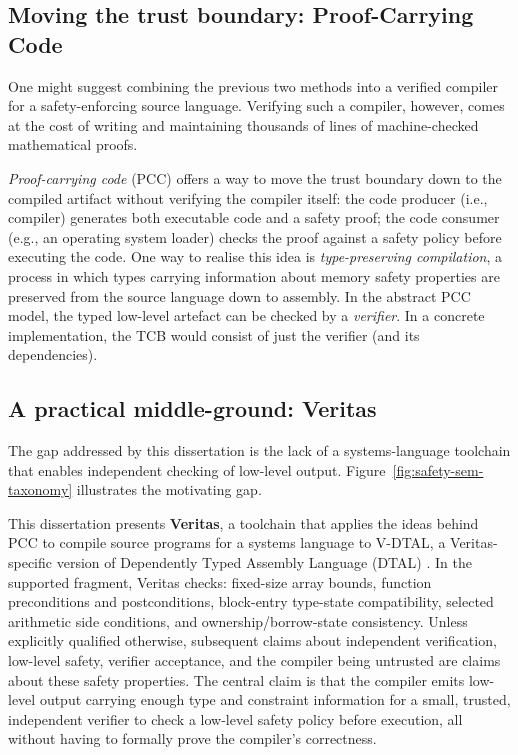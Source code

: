 \subsection{Moving the trust boundary: Proof-Carrying Code}

One might suggest combining the previous two methods into a verified compiler for a safety-enforcing source language. Verifying such a compiler, however, comes at the cost of writing and maintaining thousands of lines of machine-checked mathematical proofs.

\emph{Proof-carrying code} (PCC) \cite{Necula1997PCC} offers a way to move the trust boundary down to the compiled artifact without verifying the compiler itself: the code producer (i.e., compiler) generates both executable code and a safety proof; the code consumer (e.g., an operating system loader) checks the proof against a safety policy before executing the code. One way to realise this idea is \emph{type-preserving compilation}, a process in which types carrying information about memory safety properties are preserved from the source language down to assembly. In the abstract PCC model, the typed low-level artefact can be checked by a \emph{verifier}. In a concrete implementation, the TCB would consist of just the verifier (and its dependencies).

\subsection{A practical middle-ground: Veritas}\label{sec:intro-veritas}

The gap addressed by this dissertation is the lack of a systems-language toolchain that enables independent checking of low-level output. Figure~\ref{fig:safety-sem-taxonomy} illustrates the motivating gap.

This dissertation presents \textbf{Veritas}, a toolchain that applies the ideas behind PCC to compile source programs for a systems language to V-DTAL, a Veritas-specific version of Dependently Typed Assembly Language (DTAL) \cite{Xi2001DTAL}.
In the supported fragment, Veritas checks: fixed-size array bounds, function preconditions and postconditions, block-entry type-state compatibility, selected arithmetic side conditions, and ownership/borrow-state consistency.
Unless explicitly qualified otherwise, subsequent claims about independent verification, low-level safety, verifier acceptance, and the compiler being untrusted are claims about these safety properties.
The central claim is that the compiler emits low-level output carrying enough type and constraint information for a small, trusted, independent verifier to check a low-level safety policy before execution, all without having to formally prove the compiler's correctness.

